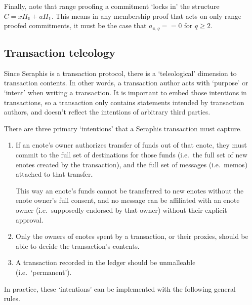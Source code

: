 Finally, note that range proofing a commitment `locks in' the structure $C = x H_0 + a H_1$. This means in any membership proof that acts on only range proofed commitments, it must be the case that $a_{\pi,q} == 0$ for $q \geq 2$.


\subsection{Transaction teleology}
\label{subsec:seraphis-tx-teleology}

Since Seraphis is a transaction protocol, there is a `teleological' dimension to transaction contents. In other words, a transaction author acts with `purpose' or `intent' when writing a transaction. It is important to embed those intentions in transactions, so a transaction only contains statements intended by transaction authors, and doesn't reflect the intentions of arbitrary third parties.

There are three primary `intentions' that a Seraphis transaction must capture.

\begin{enumerate}
    \item If an enote's owner authorizes transfer of funds out of that enote, they must commit to the full set of destinations for those funds (i.e.\ the full set of new enotes created by the transaction), and the full set of messages (i.e.\ memos) attached to that transfer.

    This way an enote's funds cannot be transferred to new enotes without the enote owner's full consent, and no message can be affiliated with an enote owner (i.e.\ supposedly endorsed by that owner) without their explicit approval.

    \item Only the owners of enotes spent by a transaction, or their proxies, should be able to decide the transaction's contents.

    \item A transaction recorded in the ledger should be unmalleable (i.e.\ `permanent').
\end{enumerate}

In practice, these `intentions' can be implemented with the following general rules.

